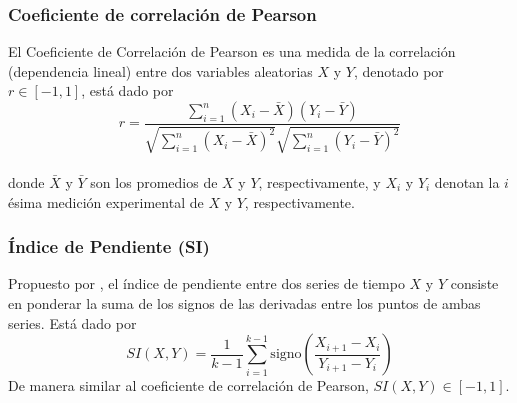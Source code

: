 \subsubsection{Coeficiente de correlación de Pearson}

El Coeficiente de Correlación de Pearson \citep{pearsoncorrwiki} es una medida de la correlación (dependencia lineal) entre dos variables aleatorias $X$ y $Y$, denotado por $r \in [-1, 1]$, está dado por
\begin{equation} 
r = \frac{\sum_{i=1}^n (X_i - \bar{X})(Y_i - \bar{Y})} {\sqrt{\sum_{i=1}^n (X_i - \bar{X})^2} \sqrt{\sum_{i=1}^n (Y_i - \bar{Y})^2}}
\end{equation}
\\
donde $\bar{X}$ y $\bar{Y}$ son los promedios de $X$ y $Y$, respectivamente, y $X_i$ y $Y_i$ denotan la $i$ésima medición experimental de $X$ y $Y$, respectivamente.

\subsubsection{Índice de Pendiente (SI)}

Propuesto por \citeauthor{Cho2006} \citep{Cho2006}, el índice de pendiente entre dos series de tiempo $X$ y $Y$ consiste en ponderar la suma de los signos de las derivadas entre los puntos de ambas series. Está dado por 
\begin{equation}
SI(X,Y) = \frac{1}{k - 1} \sum_{i=1}^{k-1} \mathrm{signo} \left(\frac{X_{i+1} - X_i} {Y_{i+1} - Y_i}\right)
\end{equation}
De manera similar al coeficiente de correlación de Pearson, $SI(X,Y)\in [-1, 1]$. 

